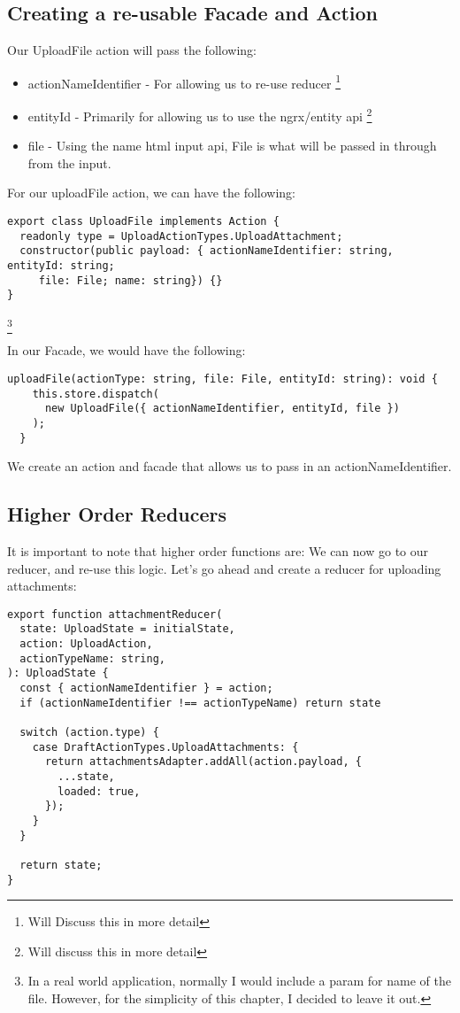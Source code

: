 \subsection{Creating a re-usable Facade and Action}
Our UploadFile action will pass the following:
\begin{itemize}
  \item actionNameIdentifier - For allowing us to re-use reducer
  \footnote{Will Discuss this in more detail}
  \item entityId - Primarily for allowing us to use the ngrx/entity api
  \footnote{Will discuss this in more detail}
  \item file - Using the name html input api, File is what will be passed in
  through from the input.
\end{itemize}
For our uploadFile action, we can have the following:
\begin{lstlisting}
export class UploadFile implements Action {
  readonly type = UploadActionTypes.UploadAttachment;
  constructor(public payload: { actionNameIdentifier: string, entityId: string;
     file: File; name: string}) {}
}
\end{lstlisting}
\footnote{In a real world application, normally I would include a param for name
of the file. However, for the simplicity of this chapter, I decided to leave
it out.}

In our Facade, we would have the following:

\begin{lstlisting}
uploadFile(actionType: string, file: File, entityId: string): void {
    this.store.dispatch(
      new UploadFile({ actionNameIdentifier, entityId, file })
    );
  }
\end{lstlisting}

We create an action and facade that allows us to pass in an
actionNameIdentifier.

\subsection{Higher Order Reducers}

It is important to note that higher order functions are:
We can now go to our reducer, and re-use this logic. Let's
go ahead and create a reducer for uploading attachments:

\begin{lstlisting}
export function attachmentReducer(
  state: UploadState = initialState,
  action: UploadAction,
  actionTypeName: string,
): UploadState {
  const { actionNameIdentifier } = action;
  if (actionNameIdentifier !== actionTypeName) return state

  switch (action.type) {
    case DraftActionTypes.UploadAttachments: {
      return attachmentsAdapter.addAll(action.payload, {
        ...state,
        loaded: true,
      });
    }
  }

  return state;
}
\end{lstlisting}

